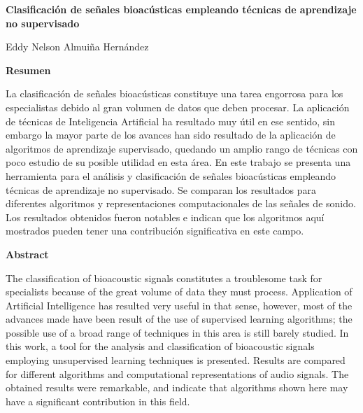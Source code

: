 \thispagestyle{empty}

\begin{center}
    \Large
    \textbf{Clasificación de señales bioacústicas empleando técnicas de aprendizaje no supervisado}

    \vspace{0.4cm}
    \large
    Eddy Nelson Almuiña Hernández

    \vspace{0.9cm}
    \textbf{Resumen}
\end{center}

La clasificación de señales bioacústicas constituye una tarea engorrosa para los especialistas debido al gran volumen de datos que deben procesar.
La aplicación de técnicas de Inteligencia Artificial ha resultado muy útil en ese sentido, sin embargo la mayor parte de los avances han sido resultado de la aplicación de algoritmos de aprendizaje supervisado, quedando un amplio rango de técnicas con poco estudio de su posible utilidad en esta área.
En este trabajo se presenta una herramienta para el análisis y clasificación de señales bioacústicas empleando técnicas de aprendizaje no supervisado.
Se comparan los resultados para diferentes algoritmos y representaciones computacionales de las señales de sonido.
Los resultados obtenidos fueron notables e indican que los algoritmos aquí mostrados pueden tener una contribución significativa en este campo.

\begin{center}
    \vspace{0.9cm}
    \textbf{Abstract}
\end{center}

The classification of bioacoustic signals constitutes a troublesome task for specialists because of the great volume of data they must process.
Application of Artificial Intelligence has resulted very useful in that sense, however, most of the advances made have been result of the use of supervised learning algorithms;
the possible use of a broad range of techniques in this area is still barely studied.
In this work, a tool for the analysis and classification of bioacoustic signals employing unsupervised learning techniques is presented.
Results are compared for different algorithms and computational representations of audio signals.
The obtained results were remarkable, and indicate that algorithms shown here may have a significant contribution in this field.

\newpage